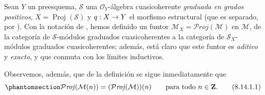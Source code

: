 \documentclass[oneside,10pt]{amsart}
\makeatletter
\newcommand{\ega@arrow}[2]{\mathchoice{#1}{#2}{#2}{#2}}
\renewcommand{\to}{\ega@arrow{\longrightarrow}{\rightarrow}}
\let\EGAOriginalLabel\label
\renewcommand{\label}[1]{\phantomsection\EGAOriginalLabel{#1}}
\makeatother
\begin{document}
\begin{env}[8.14.1]
\label{II.8.14.1-fr}
Sean $Y$ un preesquema, $\mathcal{S}$ una $\mathcal{O}_Y$-álgebra cuasicoherente \emph{graduada en grados positivos}, $X=\operatorname{Proj}(\mathcal{S})$ y $q:X\to Y$ el morfismo estructural (que es separado, por ).
Con la notación de , hemos definido un funtor $\mathcal{M}_X=\mathcal{P}\mathit{roj}(\mathcal{M})$ en $\mathcal{M}$, de la categoría de $\mathcal{S}$-módulos graduados cuasicoherentes a la categoría de $\mathcal{S}_X$-módulos graduados cuasicoherentes;
además, está claro  que este funtor es \emph{aditivo} y \emph{exacto}, y que conmuta con los límites inductivos.

Observemos, además, que de la definición  se sigue inmediatamente que
\begin{equation}
\label{II.8.14.1.1-fr}
  \mathcal{P}\mathit{roj}(\mathcal{M}(n))
  =(\mathcal{P}\mathit{roj}(\mathcal{M}))(n)
  \qquad\text{para todo }n\in\mathbf{Z}.
\tag{8.14.1.1}
\end{equation}
\end{env}
\end{document}
